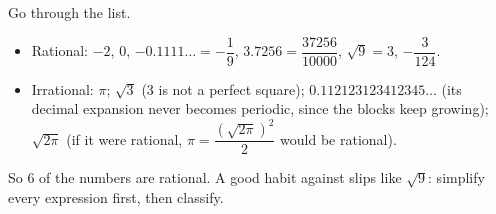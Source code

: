 Go through the list.
\begin{itemize}
\item Rational: $-2$, $0$, $-0.1111\ldots=-\dfrac{1}{9}$, $3.7256=\dfrac{37256}{10000}$, $\sqrt9=3$, $-\dfrac{3}{124}$.
\item Irrational: $\pi$; $\sqrt3$ ($3$ is not a perfect square); $0.112123123412345\ldots$ (its decimal expansion never becomes periodic, since the blocks keep growing); $\sqrt{2\pi}$ (if it were rational, $\pi=\dfrac{(\sqrt{2\pi})^2}{2}$ would be rational).
\end{itemize}
So $\boxed{6}$ of the numbers are rational. A good habit against slips like $\sqrt9$: simplify every expression first, then classify.
